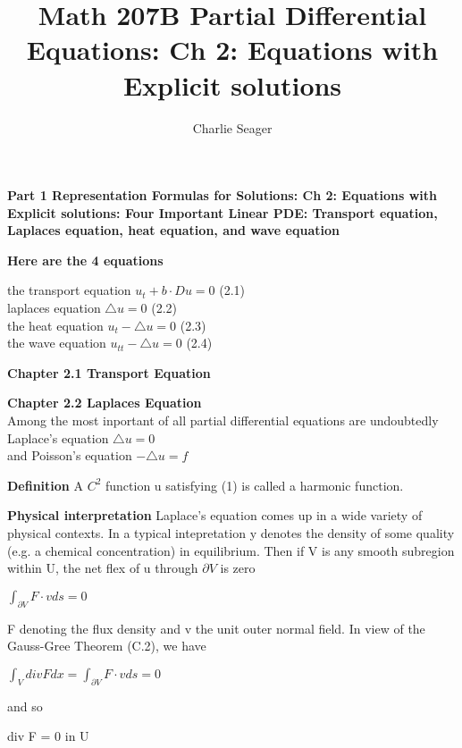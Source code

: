 \documentclass{article}
\newcommand\tab[1][1cm]{\hspace*{#1}}
\begin{document}
\title {Math 207B Partial  Differential Equations: Ch 2: Equations with Explicit solutions}

\author{Charlie Seager}

\maketitle

\textbf {Part 1 Representation Formulas for Solutions: Ch 2: Equations with Explicit solutions: Four Important Linear PDE: Transport equation, Laplaces equation, heat equation, and wave equation}

\textbf {Here are the 4 equations} 
\begin{center}
the transport equation \tab $u_t + b \cdot Du = 0$ (2.1) \\
laplaces equation \tab $\triangle u = 0$ (2.2) \\
the heat equation \tab $u_t - \triangle u = 0$ (2.3) \\
the wave equation \tab $u_{tt} - \triangle u = 0$ (2.4)
\end{center}

\textbf {Chapter 2.1 Transport Equation}

\textbf {Chapter 2.2 Laplaces Equation} \\
Among the most inportant of all partial differential equations are undoubtedly Laplace's equation
$\triangle u = 0$ \\
and Poisson's equation
$- \triangle u = f$ 

\textbf {Definition} A $C^2$ function u satisfying (1) is called a harmonic function.

\textbf {Physical interpretation} Laplace's equation comes up in a wide variety of physical contexts. In a typical intepretation y denotes the density of some quality (e.g. a chemical concentration) in equilibrium. Then if V is any smooth subregion within U, the net flex of u through $\partial V$ is zero
\begin{center}
$\int_{\partial V} F \cdot vds = 0$
\end{center}
F denoting the flux density and v the unit outer normal field. In view of the Gauss-Gree Theorem (C.2), we have
\begin{center}
$\int_V div F dx = \int_{\partial V} F \cdot vds = 0$
\end{center}
and so
\begin{center}
div F = 0 \tab in U
\end{center}
\end{document}
